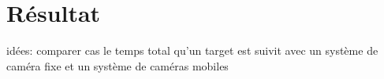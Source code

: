 \newpage
\section{Résultat}

idées: 
comparer cas le temps total qu'un target est suivit avec un système de caméra fixe et un système de caméras mobiles